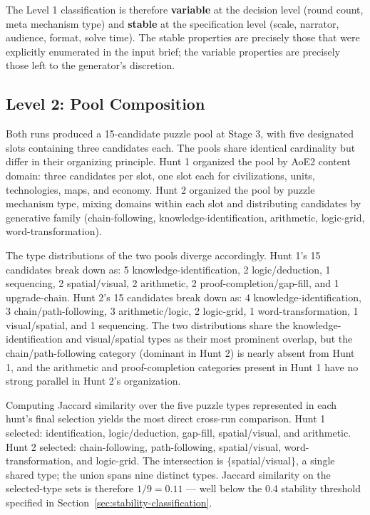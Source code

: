 The Level 1 classification is therefore \textbf{variable} at the decision level (round count, meta mechanism type) and \textbf{stable} at the specification level (scale, narrator, audience, format, solve time). The stable properties are precisely those that were explicitly enumerated in the input brief; the variable properties are precisely those left to the generator's discretion.

\subsection{Level 2: Pool Composition}
\label{sec:results-pool}

Both runs produced a 15-candidate puzzle pool at Stage 3, with five designated slots containing three candidates each. The pools share identical cardinality but differ in their organizing principle. Hunt 1 organized the pool by AoE2 content domain: three candidates per slot, one slot each for civilizations, units, technologies, maps, and economy. Hunt 2 organized the pool by puzzle mechanism type, mixing domains within each slot and distributing candidates by generative family (chain-following, knowledge-identification, arithmetic, logic-grid, word-transformation).

The type distributions of the two pools diverge accordingly. Hunt 1's 15 candidates break down as: 5 knowledge-identification, 2 logic/deduction, 1 sequencing, 2 spatial/visual, 2 arithmetic, 2 proof-completion/gap-fill, and 1 upgrade-chain. Hunt 2's 15 candidates break down as: 4 knowledge-identification, 3 chain/path-following, 3 arithmetic/logic, 2 logic-grid, 1 word-transformation, 1 visual/spatial, and 1 sequencing. The two distributions share the knowledge-identification and visual/spatial types as their most prominent overlap, but the chain/path-following category (dominant in Hunt 2) is nearly absent from Hunt 1, and the arithmetic and proof-completion categories present in Hunt 1 have no strong parallel in Hunt 2's organization.

Computing Jaccard similarity over the five puzzle types represented in each hunt's final selection yields the most direct cross-run comparison. Hunt 1 selected: identification, logic/deduction, gap-fill, spatial/visual, and arithmetic. Hunt 2 selected: chain-following, path-following, spatial/visual, word-transformation, and logic-grid. The intersection is $\{$spatial/visual$\}$, a single shared type; the union spans nine distinct types. Jaccard similarity on the selected-type sets is therefore $1/9 = 0.11$ --- well below the 0.4 stability threshold specified in Section~\ref{sec:stability-classification}.

